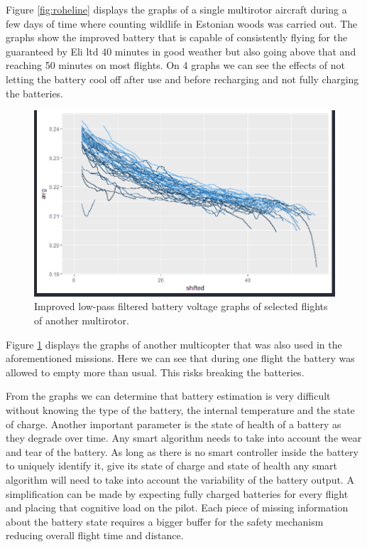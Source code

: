 \documentclass[12pt,oneside]{reedthesis}
\theoremstyle{definition}
\theoremstyle{definition}
\theoremstyle{definition}
\theoremstyle{remark}
\begin{document}
Figure \ref{fig:roheline} displays the graphs of a single multirotor
aircraft during a few days of time where counting wildlife in Estonian
woods was carried out. The graphs show the improved battery that is
capable of consistently flying for the guaranteed by Eli ltd 40 minutes
in good weather but also going above that and reaching 50 minutes on
most flights. On 4 graphs we can see the effects of not letting the
battery cool off after use and before recharging and not fully charging
the batteries.
\begin{figure}
\centering
\includegraphics{./figure/rmkValgeAku.PNG}
\caption{\label{fig:valge}Improved low-pass filtered battery voltage graphs
of selected flights of another multirotor.}
\end{figure}
Figure \ref{fig:valge} displays the graphs of another multicopter that
was also used in the aforementioned missions. Here we can see that
during one flight the battery was allowed to empty more than usual. This
risks breaking the batteries.

From the graphs we can determine that battery estimation is very
difficult without knowing the type of the battery, the internal
temperature and the state of charge. Another important parameter is the
state of health of a battery as they degrade over time. Any smart
algorithm needs to take into account the wear and tear of the battery.
As long as there is no smart controller inside the battery to uniquely
identify it, give its state of charge and state of health any smart
algorithm will need to take into account the variability of the battery
output. A simplification can be made by expecting fully charged
batteries for every flight and placing that cognitive load on the pilot.
Each piece of missing information about the battery state requires a
bigger buffer for the safety mechanism reducing overall flight time and
distance.
\end{document}
